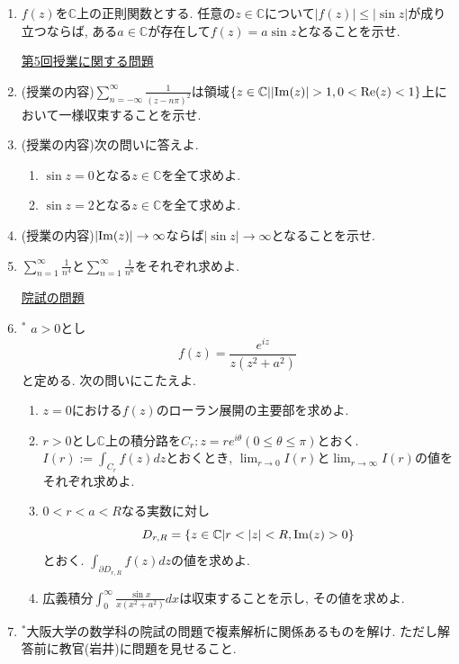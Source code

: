 \documentclass[dvipdfmx,a4paper,11pt]{article}
\newcommand{\C}{\mathbb{C}}
\theoremstyle{definition}
\begin{document}
\begin{enumerate}[label=\textbf{問}4.\arabic*]
 \item $f(z)$を$\C$上の正則関数とする. 任意の$z \in \C$について$|f(z)| \le |\sin z|$が成り立つならば, ある$a \in \C$が存在して$f(z) = a \sin z$となることを示せ. 
 


      
 \vspace{12pt}
\hspace{-36pt}\underline{第5回授業に関する問題}     
  \item (授業の内容)$\sum_{n= - \infty}^{\infty} \frac{1}{(z - n \pi)^2}$は領域$\{ z \in \C | |{\rm Im}(z)| >1, 0 < {\rm Re}(z) < 1\}$上において一様収束することを示せ.

 \item  (授業の内容)次の問いに答えよ.
  \begin{enumerate}
\setlength{\parskip}{0cm} 
  \setlength{\itemsep}{0cm} 
\item $\sin z =0$となる$z \in \C$を全て求めよ. 
\item $\sin z =2$となる$z \in \C$を全て求めよ. 
   \end{enumerate}
   
 \item  (授業の内容)$|{ \rm Im}(z)| \rightarrow \infty$ならば$|\sin z| \rightarrow \infty$となることを示せ.
 
 
\item $\sum_{n=1}^{\infty}\frac{1}{n^4}$と$\sum_{n=1}^{\infty}\frac{1}{n^6}$をそれぞれ求めよ. 

   
 
\vspace{12pt}
\hspace{-36pt}\underline{院試の問題}  
  \item $^{*}$ $a>0$とし
  $$
  f(z) = \frac{ e^{iz}}{z(z^2 + a^2)}
  $$
  と定める. 次の問いにこたえよ.
   \begin{enumerate}
 \setlength{\parskip}{0cm} 
  \setlength{\itemsep}{0cm} 
  \item $z=0$における$f(z)$のローラン展開の主要部を求めよ.
  \item $r>0$とし$\C$上の積分路を$C_{r} : z = r e^{i \theta} (0 \le \theta \le \pi)$とおく. 
  $I(r) := \int_{C_r} f(z )dz$とおくとき, $\lim_{r \rightarrow 0} I(r)$と$\lim_{r \rightarrow \infty} I(r)$の値をそれぞれ求めよ.
  \item $0 < r < a < R$なる実数に対し
  $$
  D_{r,R}= \{ z \in \C | r < |z| < R, {\rm Im}(z) >0 \}
  $$
  とおく. $\int_{\partial D_{r,R}} f(z) dz$の値を求めよ.
  \item 広義積分$\int_{0}^{\infty}\frac{ \sin x}{x(x^2 + a^2)} dx$は収束することを示し, その値を求めよ.
      \end{enumerate}
     
\item $^{*}$大阪大学の数学科の院試の問題で複素解析に関係あるものを解け. ただし解答前に教官(岩井)に問題を見せること. 

    \end{enumerate}      
 
\end{document}
